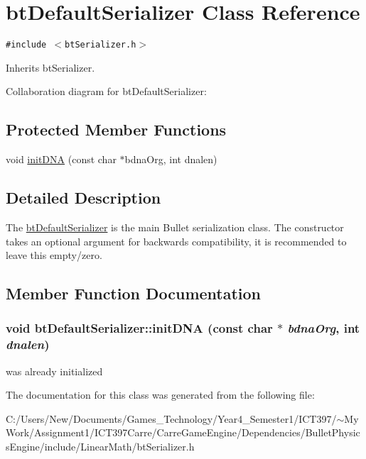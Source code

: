\hypertarget{classbt_default_serializer}{
\section{btDefaultSerializer Class Reference}
\label{classbt_default_serializer}
}
{\tt \#include $<$btSerializer.h$>$}

Inherits btSerializer.

Collaboration diagram for btDefaultSerializer:\subsection*{Protected Member Functions}
\begin{CompactItemize}
\item 
void \hyperlink{classbt_default_serializer_086b9ce0a49cb08de90528644bfe9d83}{initDNA} (const char $\ast$bdnaOrg, int dnalen)
\end{CompactItemize}


\subsection{Detailed Description}
The \hyperlink{classbt_default_serializer}{btDefaultSerializer} is the main Bullet serialization class. The constructor takes an optional argument for backwards compatibility, it is recommended to leave this empty/zero. 

\subsection{Member Function Documentation}
\hypertarget{classbt_default_serializer_086b9ce0a49cb08de90528644bfe9d83}{
\subsubsection[initDNA]{\setlength{\rightskip}{0pt plus 5cm}void btDefaultSerializer::initDNA (const char $\ast$ {\em bdnaOrg}, \/  int {\em dnalen})}}
\label{classbt_default_serializer_086b9ce0a49cb08de90528644bfe9d83}




was already initialized 

The documentation for this class was generated from the following file:\begin{CompactItemize}
\item 
C:/Users/New/Documents/Games\_\-Technology/Year4\_\-Semester1/ICT397/$\sim$My Work/Assignment1/ICT397Carre/CarreGameEngine/Dependencies/BulletPhysicsEngine/include/LinearMath/btSerializer.h\end{CompactItemize}
